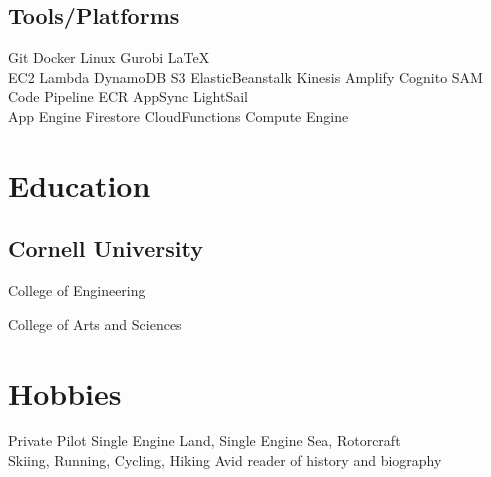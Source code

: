 \documentclass[]{plushcv}
\begin{document}
\begin{minipage}[t]{0.25\textwidth}
    \subsection{Tools/Platforms}
    \sectionsep
    Git  \textbullet{} Docker \textbullet{} Linux \textbullet{} Gurobi \textbullet{} \LaTeX \\
    \sectionsep
    EC2 \textbullet{} Lambda \textbullet{} DynamoDB \textbullet{} S3 \textbullet{} ElasticBeanstalk
    \textbullet{} Kinesis \textbullet{} Amplify \textbullet{} Cognito \textbullet{} SAM 
    \textbullet{} Code Pipeline \textbullet{} ECR \textbullet{} AppSync \textbullet{} LightSail\\
    \sectionsep
    App Engine \textbullet{} Firestore \textbullet{} CloudFunctions \textbullet{} Compute Engine
    
    \sectionsep
    
    
    \section{Education} 
    \subsection{Cornell University}
    College of Engineering \\
    
    \sectionsep
    College of Arts and Sciences \\
    \sectionsep

    \section{Hobbies}
    Private Pilot Single Engine Land, Single Engine Sea, Rotorcraft\\
    Skiing, Running, Cycling, Hiking
    Avid reader of history and biography

    
    

\end{minipage}
\end{document}
